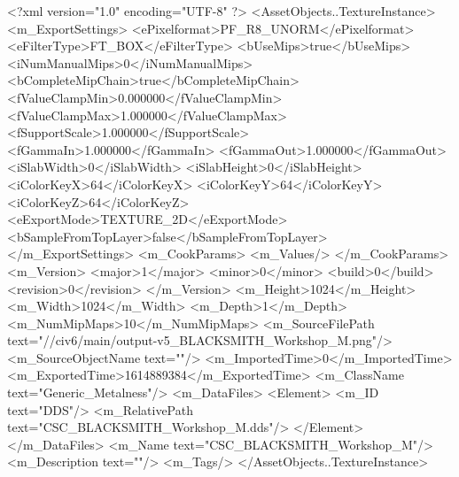 <?xml version="1.0" encoding="UTF-8" ?>
<AssetObjects..TextureInstance>
	<m_ExportSettings>
		<ePixelformat>PF_R8_UNORM</ePixelformat>
		<eFilterType>FT_BOX</eFilterType>
		<bUseMips>true</bUseMips>
		<iNumManualMips>0</iNumManualMips>
		<bCompleteMipChain>true</bCompleteMipChain>
		<fValueClampMin>0.000000</fValueClampMin>
		<fValueClampMax>1.000000</fValueClampMax>
		<fSupportScale>1.000000</fSupportScale>
		<fGammaIn>1.000000</fGammaIn>
		<fGammaOut>1.000000</fGammaOut>
		<iSlabWidth>0</iSlabWidth>
		<iSlabHeight>0</iSlabHeight>
		<iColorKeyX>64</iColorKeyX>
		<iColorKeyY>64</iColorKeyY>
		<iColorKeyZ>64</iColorKeyZ>
		<eExportMode>TEXTURE_2D</eExportMode>
		<bSampleFromTopLayer>false</bSampleFromTopLayer>
	</m_ExportSettings>
	<m_CookParams>
		<m_Values/>
	</m_CookParams>
	<m_Version>
		<major>1</major>
		<minor>0</minor>
		<build>0</build>
		<revision>0</revision>
	</m_Version>
	<m_Height>1024</m_Height>
	<m_Width>1024</m_Width>
	<m_Depth>1</m_Depth>
	<m_NumMipMaps>10</m_NumMipMaps>
	<m_SourceFilePath text="//civ6/main/output\blacksmith-v5\Textures\CSC_BLACKSMITH_Workshop_M.png"/>
	<m_SourceObjectName text=""/>
	<m_ImportedTime>0</m_ImportedTime>
	<m_ExportedTime>1614889384</m_ExportedTime>
	<m_ClassName text="Generic_Metalness"/>
	<m_DataFiles>
		<Element>
			<m_ID text="DDS"/>
			<m_RelativePath text="CSC_BLACKSMITH_Workshop_M.dds"/>
		</Element>
	</m_DataFiles>
	<m_Name text="CSC_BLACKSMITH_Workshop_M"/>
	<m_Description text=""/>
	<m_Tags/>
</AssetObjects..TextureInstance>

